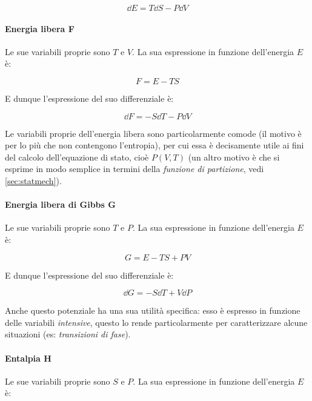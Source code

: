 \begin{equation*}
\dd E = T \dd S - P \dd V
\end{equation*}

\paragraph{Energia libera F} Le sue variabili proprie sono $T$ e $V$. La sua espressione in funzione dell'energia $E$ è:

\begin{equation*}
F = E - T S
\end{equation*}

E dunque l'espressione del suo differenziale è:

\begin{equation*}
\dd F = - S \dd T - P \dd V
\end{equation*}

\begin{note}
	Le variabili proprie dell'energia libera sono particolarmente comode (il motivo è per lo più che non contengono l'entropia), per cui essa è decisamente utile ai fini del calcolo dell'equazione di stato, cioè $ P(V,T) $ (un altro motivo è che si esprime in modo semplice in termini della \textit{funzione di partizione}, vedi \cref{sec:statmech}).
\end{note}

\paragraph{Energia libera di Gibbs G }Le sue variabili proprie sono $T$ e $P$. La sua espressione in funzione dell'energia $E$ è:

\begin{equation*}
G = E - T S + P V
\end{equation*}

E dunque l'espressione del suo differenziale è:

\begin{equation*}
\dd G = - S \dd T + V \dd P
\end{equation*}

\begin{note}
	Anche questo potenziale ha una sua utilità specifica: esso è espresso in funzione delle variabili \textit{intensive}, questo lo rende particolarmente per caratterizzare alcune situazioni (es: \textit{transizioni di fase}).
\end{note}


\paragraph{Entalpia H}Le sue variabili proprie sono $S$ e $P$. La sua espressione in funzione dell'energia $E$ è:

